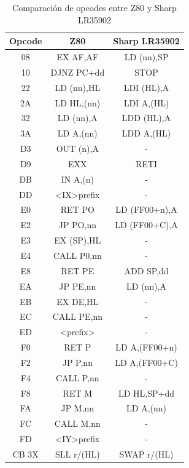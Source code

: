 \begin{table}[H]
    \centering
    \begin{tabular}{|c|c|c|}
        \hline
        \textbf{Opcode} & \textbf{Z80} & \textbf{Sharp LR35902} \\
        \hline
        08 & EX AF,AF & LD (nn),SP \\ \hline
        10 & DJNZ PC+dd & STOP \\ \hline
        22 & LD (nn),HL & LDI (HL),A \\ \hline
        2A & LD HL,(nn) & LDI A,(HL) \\ \hline
        32 & LD (nn),A & LDD (HL),A \\ \hline
        3A & LD A,(nn) & LDD A,(HL) \\ \hline
        D3 & OUT (n),A & - \\ \hline
        D9 & EXX & RETI \\ \hline
        DB & IN A,(n) & - \\ \hline
        DD & \textless IX\textgreater prefix & - \\ \hline
        E0 & RET PO & LD (FF00+n),A \\ \hline
        E2 & JP PO,nn & LD (FF00+C),A \\ \hline
        E3 & EX (SP),HL & - \\ \hline
        E4 & CALL P0,nn & - \\ \hline
        E8 & RET PE & ADD SP,dd \\ \hline
        EA & JP PE,nn & LD (nn),A \\ \hline
        EB & EX DE,HL & - \\ \hline
        EC & CALL PE,nn & - \\ \hline
        ED & \textless prefix\textgreater & - \\ \hline
        F0 & RET P & LD A,(FF00+n) \\ \hline
        F2 & JP P,nn & LD A,(FF00+C) \\ \hline
        F4 & CALL P,nn & - \\ \hline
        F8 & RET M & LD HL,SP+dd \\ \hline
        FA & JP M,nn & LD A,(nn) \\ \hline
        FC & CALL M,nn & - \\ \hline
        FD & \textless IY\textgreater prefix & - \\ \hline
        CB 3X & SLL r/(HL) & SWAP r/(HL) \\
        \hline
    \end{tabular}
    \caption{Comparación de opcodes entre Z80 y Sharp LR35902}
\end{table}


